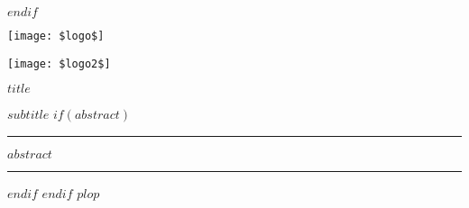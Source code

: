 \begin{titlepage}
$endif$
%
%
\newpage
\pagestyle{empty}
\begin{minipage}{\linewidth}

  \texttt{[image: \$logo\$]}

  \texttt{[image: \$logo2\$]}

\end{minipage}

\vspace{2cm}

\LARGE\textbf{$title$}


\large\textbf{$subtitle$}
$if(abstract)$

\vspace{2cm}

\begin{center}

\end{center}
\par\rule{\textwidth}{0.5pt}

$abstract$

\par\rule{\textwidth}{0.5pt}


$endif$
$endif$
$plop$
\end{titlepage}
